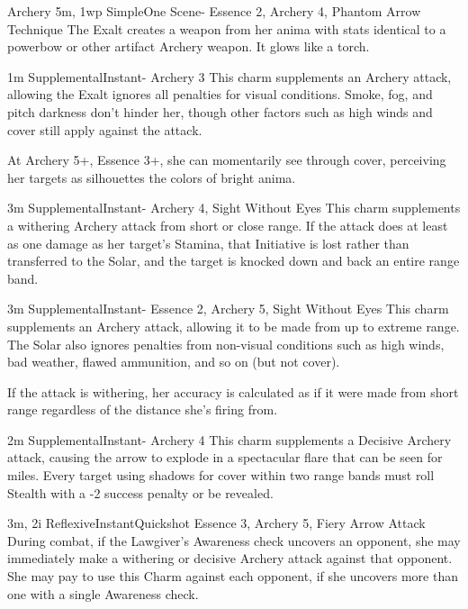 \begin{Ability}{Archery}
  {5m, 1wp}
  {Simple}{One Scene}{-}
  {Essence 2, Archery 4, Phantom Arrow Technique}
  The Exalt creates a weapon from her anima with stats identical to a powerbow or other artifact Archery weapon. It glows like a torch.

  {1m}
  {Supplemental}{Instant}{-}
  {Archery 3}
  This charm supplements an Archery attack, allowing the Exalt ignores all penalties for visual conditions. Smoke, fog, and pitch darkness don't hinder her, though other factors such as high winds and cover still apply against the attack.

  At Archery 5+, Essence 3+, she can momentarily see through cover, perceiving her targets as silhouettes the colors of bright anima.

  {3m}
  {Supplemental}{Instant}{-}
  {Archery 4, Sight Without Eyes}
  This charm supplements a withering Archery attack from short or close range. If the attack does at least as one damage as her target's Stamina, that Initiative is lost rather than transferred to the Solar, and the target is knocked down and back an entire range band.

  {3m}
  {Supplemental}{Instant}{-}
  {Essence 2, Archery 5, Sight Without Eyes}
  This charm supplements an Archery attack, allowing it to be made from up to extreme range. The Solar also ignores penalties from non-visual conditions such as high winds, bad weather, flawed ammunition, and so on (but not cover).

  If the attack is withering, her accuracy is calculated as if it were made from short range regardless of the distance she's firing from.

  {2m}
  {Supplemental}{Instant}{-}
  {Archery 4}
  This charm supplements a Decisive Archery attack, causing the arrow to explode in a spectacular flare that can be seen for miles. Every target using shadows for cover within two range bands must roll Stealth with a -2 success penalty or be revealed.

  {3m, 2i}
  {Reflexive}{Instant}{Quickshot}
  {Essence 3, Archery 5, Fiery Arrow Attack}
  During combat, if the Lawgiver's Awareness check uncovers an opponent, she may immediately make a withering or decisive Archery attack against that opponent. She may pay to use this Charm against each opponent, if she uncovers more than one with a single Awareness check.

\end{Ability}

